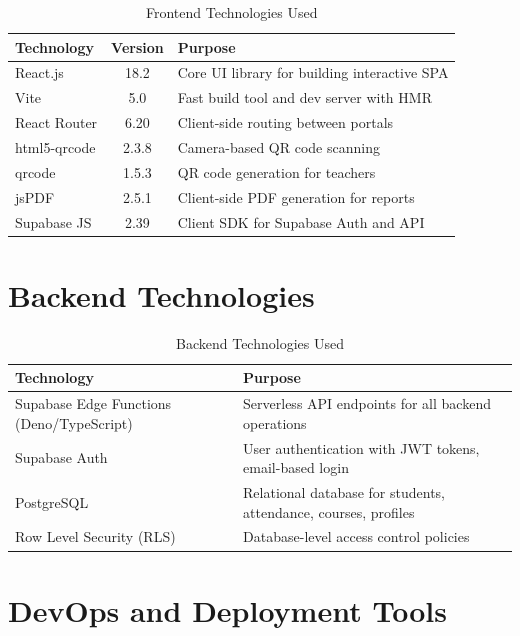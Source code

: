 \documentclass{SOICTthesis}
\begin{document}
\begin{table}[H]
\centering
\caption{Frontend Technologies Used}
\label{tab:frontend_tech}
\begin{tabular}{|l|c|p{7cm}|}
    \hline
    \textbf{Technology} & \textbf{Version} & \textbf{Purpose} \\
    \hline
    React.js & 18.2 & Core UI library for building interactive SPA \\
    \hline
    Vite & 5.0 & Fast build tool and dev server with HMR \\
    \hline
    React Router & 6.20 & Client-side routing between portals \\
    \hline
    html5-qrcode & 2.3.8 & Camera-based QR code scanning \\
    \hline
    qrcode & 1.5.3 & QR code generation for teachers \\
    \hline
    jsPDF & 2.5.1 & Client-side PDF generation for reports \\
    \hline
    Supabase JS & 2.39 & Client SDK for Supabase Auth and API \\
    \hline
\end{tabular}
\end{table}

\section{Backend Technologies}
\label{sec:backend_tech}

\begin{table}[H]
\centering
\caption{Backend Technologies Used}
\label{tab:backend_tech}
\begin{tabular}{|p{4.5cm}|p{8cm}|}
    \hline
    \textbf{Technology} & \textbf{Purpose} \\
    \hline
    Supabase Edge Functions (Deno/TypeScript) & Serverless API endpoints for all backend operations \\
    \hline
    Supabase Auth & User authentication with JWT tokens, email-based login \\
    \hline
    PostgreSQL & Relational database for students, attendance, courses, profiles \\
    \hline
    Row Level Security (RLS) & Database-level access control policies \\
    \hline
\end{tabular}
\end{table}

\section{DevOps and Deployment Tools}
\label{sec:devops}
\end{document}
